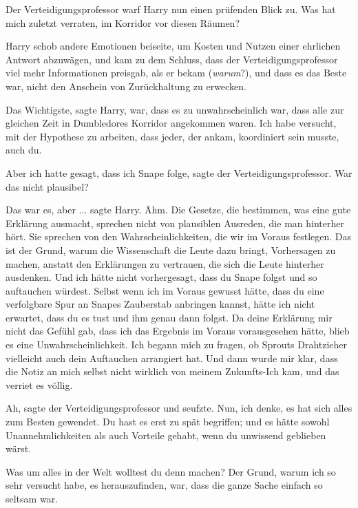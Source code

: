 Der Verteidigungsprofessor warf Harry nun einen prüfenden Blick zu. \glqq{}Was
hat mich zuletzt verraten, im Korridor vor diesen Räumen?\grqq{}

Harry schob andere Emotionen beiseite, um Kosten und Nutzen einer ehrlichen
Antwort abzuwägen, und kam zu dem Schluss, dass der Verteidigungsprofessor viel
mehr Informationen preisgab, als er bekam (\emph{warum}?), und dass es das Beste
war, nicht den Anschein von Zurückhaltung zu erwecken.

\glqq{}Das Wichtigste\grqq{}, sagte Harry, \glqq{}war, dass es zu unwahrscheinlich
war, dass alle zur gleichen Zeit in Dumbledores Korridor angekommen waren. Ich
habe versucht, mit der Hypothese zu arbeiten, dass jeder, der ankam, koordiniert
sein musste, auch du.\grqq{}

\glqq{}Aber ich hatte gesagt, dass ich Snape folge\grqq{}, sagte der
Verteidigungsprofessor. \glqq{}War das nicht plausibel?\grqq{}

\glqq{}Das war es, aber ...\grqq{} sagte Harry. \glqq{}Ähm. Die Gesetze, die
bestimmen, was eine gute Erklärung ausmacht, sprechen nicht von plausiblen
Ausreden, die man hinterher hört. Sie sprechen von den Wahrscheinlichkeiten, die
wir im Voraus festlegen. Das ist der Grund, warum die Wissenschaft die Leute
dazu bringt, Vorhersagen zu machen, anstatt den Erklärungen zu vertrauen, die
sich die Leute hinterher ausdenken. Und ich hätte nicht vorhergesagt, dass du
Snape folgst und so auftauchen würdest. Selbst wenn ich im Voraus gewusst hätte,
dass du eine verfolgbare Spur an Snapes Zauberstab anbringen kannst, hätte ich
nicht erwartet, dass du es tust und ihm genau dann folgst. Da deine Erklärung
mir nicht das Gefühl gab, dass ich das Ergebnis im Voraus vorausgesehen hätte,
blieb es eine Unwahrscheinlichkeit. Ich begann mich zu fragen, ob Sprouts
Drahtzieher vielleicht auch dein Auftauchen arrangiert hat. Und dann wurde mir
klar, dass die Notiz an mich selbst nicht wirklich von meinem Zukunfts-Ich kam,
und das verriet es völlig.\grqq{}

\glqq{}Ah\grqq{}, sagte der Verteidigungsprofessor und seufzte. \glqq{}Nun, ich
denke, es hat sich alles zum Besten gewendet. Du hast es erst zu spät begriffen;
und es hätte sowohl Unannehmlichkeiten als auch Vorteile gehabt, wenn du
unwissend geblieben wärst.\grqq{}

\glqq{}Was um alles in der Welt wolltest du denn machen? Der Grund, warum ich so
sehr versucht habe, es herauszufinden, war, dass die ganze Sache einfach so
seltsam war.\grqq{}


